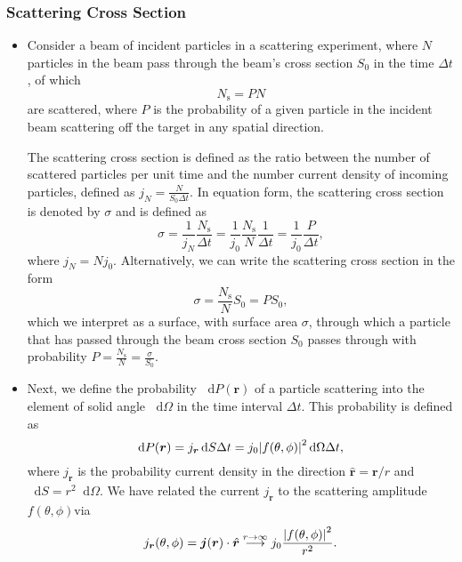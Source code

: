 \documentclass[11pt, a4paper]{article}
\newcommand{\diff}{\mathop{}\!\mathrm{d}} %
\renewcommand{\vec}[1]{\bm{#1}}  %
\newcommand{\uvec}[1]{\hat{\vec{#1}}}  %
\renewcommand{\r}{\vec{r}}  %
\begin{document}
\subsubsection{Scattering Cross Section}
\begin{itemize}
    \item Consider a beam of incident particles in a scattering experiment, where $ N $ particles in the beam pass through the beam's cross section $ S_{0} $ in the time $ \Delta t $, of which 
    \begin{equation*}
        N_{\text{s}} = P N
    \end{equation*}
    are scattered, where $ P $ is the probability of a given particle in the incident beam scattering off the target in any spatial direction. 

    The scattering cross section is defined as the ratio between the number of scattered particles per unit time and the number current density of incoming particles, defined as $ j_{N} = \frac{N}{S_{0}\Delta t}$. In equation form, the scattering cross section is denoted by $ \sigma $ and is defined as
    \begin{equation*}
        \sigma = \frac{1}{j_{N}}  \frac{N_{\text{s}}}{\Delta t} = \frac{1}{j_{0}} \frac{N_{\text{s}}}{N} \frac{1}{\Delta t} = \frac{1}{j_{0}} \frac{P}{\Delta t},
    \end{equation*}
    where $ j_{N} = N j_{0} $. Alternatively, we can write the scattering cross section in the form
    \begin{equation*}
        \sigma = \frac{N_{\text{s}}}{N}S_{0} = P S_{0},
    \end{equation*}
    which we interpret as a surface, with surface area $ \sigma $, through which a particle that has passed through the beam cross section $ S_{0} $ passes through with probability $ P = \frac{N_{\text{s}}}{N} = \frac{\sigma}{S_{0}}$.

    \item Next, we define the probability $ \diff P(\r) $ of a particle scattering into the element of solid angle $ \diff \Omega $ in the time interval $ \Delta t $. This probability is defined as
    \begin{equation*}
        \diff P(\r) = j_{\r} \diff S \Delta t = j_{0} \abs{f(\theta, \phi)}^{2} \diff \Omega \Delta t,
    \end{equation*}
    where $ j_{\r} $ is the probability current density in the direction $ \uvec{r} = \r /r $ and $ \diff S = r^{2} \diff \Omega $. We have related the current $ j_{\r} $ to the scattering amplitude $ f(\theta, \phi) $via
    \begin{equation*}
        j_{\r}(\theta, \phi) = \vec{j}(\r) \cdot \uvec{r} \stackrel{r \to \infty}{\longrightarrow} j_{0} \frac{\abs{f(\theta, \phi)}^{2}}{r^{2}}.
    \end{equation*}


\end{itemize}
\end{document}
